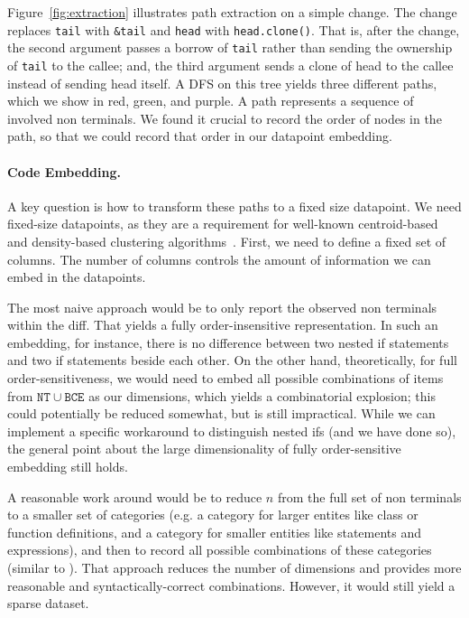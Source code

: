 Figure~\ref{fig:extraction} illustrates path extraction on a simple change. The change replaces \verb+tail+ with \verb+&tail+ and \verb+head+ with \verb+head.clone()+. That is, after the change, the second argument passes a borrow of \verb+tail+ rather than sending the ownership of \verb+tail+ to the callee; and, the third argument sends a clone of head to the callee instead of sending head itself. A DFS on this tree yields three different paths, which we show in red, green, and purple. A path represents a sequence of involved non terminals. We found it crucial to record the order of nodes in the path, so that we could record that order in our datapoint embedding.

\paragraph{Code Embedding.} A key question is how to transform these paths to a fixed size datapoint. We need fixed-size datapoints, as they are a requirement for well-known centroid-based and density-based clustering algorithms~\citep{xu2005survey}. First, we need to define a fixed set of columns. The number of columns controls the amount of information we can embed in the datapoints. 

The most naive approach would be to only report the observed non terminals within the diff. That yields a fully order-insensitive representation. In such an embedding, for instance, there is no difference between two nested if statements and two if statements beside each other. On the other hand, theoretically, for full order-sensitiveness, we would need to embed all possible combinations of items from $\mathtt{NT} \cup \mathtt{BCE}$ as our dimensions, which yields a combinatorial explosion; this could potentially be reduced somewhat, but is still impractical. While we can implement a specific workaround to distinguish nested ifs (and we have done so), the general point about the large dimensionality of fully order-sensitive embedding still holds.

A reasonable work around would be to reduce $n$ from the full set of non terminals to a smaller set of categories (e.g. a category for larger entites like class or function definitions, and a category for smaller entities like statements and expressions), and then to record all possible combinations of these categories (similar to \cite{hanam2016discovering}). That approach reduces the number of dimensions and provides more reasonable and syntactically-correct combinations. However, it would still yield a sparse dataset. 

